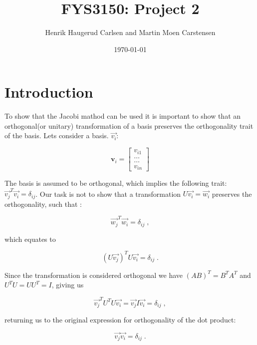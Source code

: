 \documentclass[english,a4paper, 11pt]{article}
\title{FYS3150: Project 2}
\author{Henrik Haugerud Carlsen and Martin Moen Carstensen}
\date{\today}
\begin{document}
\maketitle

\begin{abstract}
\centering

\end{abstract}


\section{Introduction}

To show that the Jacobi mathod can be used it is important to show that an orthogonal(or unitary) transformation of a basis preserves the orthogonality trait of the basis.
Lets consider a basis. $\vec{v_i}$:

\begin{equation}
\mathbf{v}_i = \begin{bmatrix} v_{i1} \\ \dots \\ \dots \\v_{in} \end{bmatrix}
\label{eq1}
\end{equation}

The basis is assumed to be orthogonal, which implies the following trait: $ \vec{v_j}^T\vec{v_i} = \delta_{ij}$. Our task is not to show that a transformation $U\vec{v_i} = \vec{w_i}$ preserves the orthogonality, such that :

\begin{equation}
\vec{w_j}^T\vec{w_i} = \delta_{ij}\;,
\label{eq2}
\end{equation}

which equates to

\begin{equation}
(U\vec{v_j})^T U\vec{v_i} = \delta_{ij}\;.
\label{eq3}
\end{equation}

Since the transformation is considered orthogonal we have $(AB)^T = B^TA^T$ and $U^TU = UU^T = I$, giving us

\begin{equation}
\vec{v_j}^TU^TU\vec{v_i} = \vec{v_j}I\vec{v_i} = \delta_{ij}\;,
\label{eq4}
\end{equation}

returning us to the original expression for orthogonality of the dot product:

\begin{equation}
\vec{v_j}\vec{v_i} = \delta_{ij}\;.
\label{eq5}
\end{equation}
\end{document}
